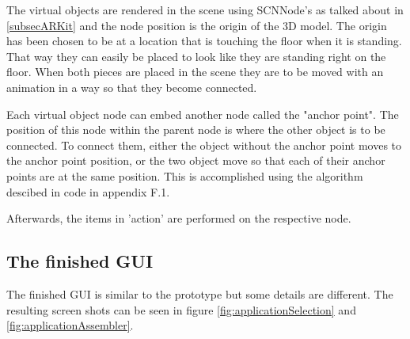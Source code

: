 The virtual objects are rendered in the scene using SCNNode's as talked about in \ref{subsecARKit} and the node position is the origin of the 3D model. The origin has been chosen to be at a location that is touching the floor when it is standing. That way they can easily be placed to look like they are standing right on the floor.
When both pieces are placed in the scene they are to be moved with an animation in a way so that they become connected.

Each virtual object node can embed another node called the "anchor point". The position of this node within the parent node is where the other object is to be connected. To connect them, either the object without the anchor point moves to the anchor point position, or the two object move so that each of their anchor points are at the same position.
This is accomplished using the algorithm descibed in code in appendix F.1.

Afterwards, the items in 'action' are performed on the respective node.

\subsection{The finished GUI}
The finished GUI is similar to the prototype but some details are different. The resulting screen shots
can be seen in figure \ref{fig:applicationSelection} and \ref{fig:applicationAssembler}.

